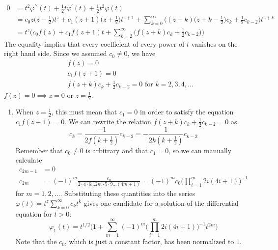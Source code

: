 \documentclass{article}
\newcounter{example}[section]
\begin{document}
\begin{example}
\begin{align*}
          0 & = t^2 \varphi^{\prime\prime} (t) + \frac{1}{2} t \varphi^\prime (t) + \frac{1}{2} t^2 \varphi (t) \\
          & = c_0 z \bigg(z - \frac{1}{2}\bigg) t^z + c_1 (z+1) \bigg( z+\frac{1}{2}\bigg) t^{z+1} + \sum_{k=0}^\infty \bigg( (z+k) \Big(z+k-\frac{1}{2} \Big) c_k + \frac{1}{2} c_{k-2}\bigg) t^{z+k}\\
          & = t^z \Bigg( c_0 f(z) + c_1 f(z+1) t + \sum_{k=2}^\infty \bigg( f(z+k) c_k + \frac{1}{2} c_{k-2} \bigg)\Bigg) 
      \end{align*}
      The equality implies that every coefficient of every power of $t$ vanishes on the right hand side. Since we assumed $c_0 \neq 0$, we have
      \begin{align*}
          &f(z) = 0 \\
          &c_1 f(z+1) = 0 \\
          &f(z+k) c_k + \frac{1}{2} c_{k-2} = 0 \text{ for } k = 2, 3, 4, \ldots 
      \end{align*}
      $f(z) = 0 \implies z = 0$ or $z = \frac{1}{2}$. 
      \begin{enumerate}
          \item When $z = \frac{1}{2}$, this must mean that $c_1 = 0$ in order to satisfy the equation $c_1 f(z+1) = 0$. We can rewrite the relation $f(z+k) c_k + \frac{1}{2} c_{k-2} = 0$ as
          \begin{equation}
            c_k = \frac{-1}{2 f(k + \frac{1}{2})} c_{k-2} = -\frac{1}{2k (k+\frac{1}{2})} c_{k-2}
          \end{equation}
          Remember that $c_0 \neq 0$ is arbitrary and that $c_1 = 0$, so we can manually calculate 
          \begin{align*}
              c_{2m-1} & = 0 \\
              c_{2m} & = (-1)^m \frac{c_0}{2 \cdot 4 \cdot 6 \ldots 2m \cdot 5 \cdot 9 \ldots (4m+1)} = (-1)^m c_0 \bigg( \prod_{i=1}^m 2i (4i + 1) \bigg)^{-1}
          \end{align*}
          for $m = 1, 2, \ldots $. Substituting these quantities into the series $\varphi(t) = t^z \sum_{k=0}^\infty c_k t^k$ gives
          one candidate for a solution of the differential equation for $t>0$:
          \begin{equation}
            \varphi_1 (t) = t^{1/2} \Bigg( 1 + \sum_{m=1}^\infty (-1)^m \bigg( \prod_{i=1}^m 2i (4i + 1) \bigg)^{-1} t^{2m} \Bigg)
          \end{equation}
          Note that the $c_0$, which is just a constant factor, has been normalized to $1$. 

\end{enumerate}
\end{example}
\end{document}
